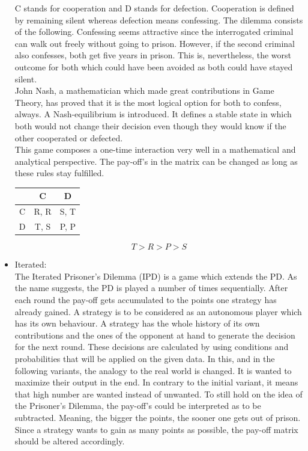 \documentclass{article}
\begin{document}
\begin{itemize}
C stands for cooperation and D stands for defection. 
Cooperation is defined by remaining silent whereas defection means confessing. 
The dilemma consists of the following. 
Confessing seems attractive since the interrogated criminal can walk out freely without going to prison. 
However, if the second criminal also confesses, both get five years in prison. 
This is, nevertheless, the worst outcome for both which could have been avoided as both could have stayed silent.\\
John Nash, a mathematician which made great contributions in Game Theory, has proved that it is the most logical option for both to confess, always. 
A Nash-equilibrium is introduced. 
It defines a stable state in which both would not change their decision even though they would know if the other cooperated or defected.\\
This game composes a one-time interaction very well in a mathematical and analytical perspective. 
The pay-off's in the matrix can be changed as long as these rules stay fulfilled.

\begin{center}
\begin{tabular}{ c|c|c }
   & C & D \\ 
   \hline
 C & R, R & S, T\\  
   \hline
 D & T, S & P, P
\end{tabular}
\end{center}

$$T > R > P > S$$

	\item Iterated:\\
		
The Iterated Prisoner's Dilemma (IPD) is a game which extends the PD. 
As the name suggests, the PD is played a number of times sequentially. 
After each round the pay-off gets accumulated to the points one strategy has already gained. 
A strategy is to be considered as an autonomous player which has its own behaviour.
A strategy has the whole history of its own contributions and the ones of the opponent at hand to generate the decision for the next round.
These decisions are calculated by using conditions and probabilities that will be applied on the given data.
In this, and in the following variants, the analogy to the real world is changed.
It is wanted to maximize their output in the end.
In contrary to the initial variant, it means that high number are wanted instead of unwanted.
To still hold on the idea of the Prisoner's Dilemma, the pay-off's could be interpreted as to be subtracted.
Meaning, the bigger the points, the sooner one gets out of prison.
Since a strategy wants to gain as many points as possible, the pay-off matrix should be altered accordingly.\\


\end{itemize}
\end{document}
